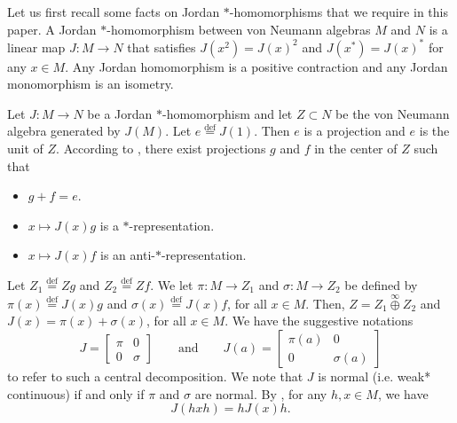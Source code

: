 \documentclass[leqno]{article} %
\newcommand{\co}{\colon}
\newcommand{\ov}{\overset}
\numberwithin{equation}{section}
\begin{document}
Let us first recall some facts on Jordan $*$-homomorphisms that we require in this paper. A Jordan $*$-homomorphism between von Neumann algebras $M$ and $N$ is a linear map $J \co M \to N$ that satisfies $J(x^2)=J(x)^2$ and $J(x^*)=J(x)^*$ for any $x \in M$. 
Any Jordan homomorphism is a positive contraction and any Jordan monomorphism is an isometry.

Let $J \co M \to N$ be a Jordan $*$-homomorphism and let $Z \subset N$ be the von Neumann algebra generated by $J(M)$. Let $e \ov{\mathrm{def}}{=} J(1)$. Then $e$ is a projection and $e$ is the unit of $Z$. According to \cite[Theorem 3.3]{Sto11}, there exist projections $g$ and $f$ in the center of $Z$ such that
\begin{itemize}
	\item [(i)] $g+f=e$.
	\item [(ii)] $x \mapsto J(x)g$ is a $*$-representation.
	\item [(iii)] $x \mapsto J(x)f$ is an anti-$*$-representation. 
\end{itemize}
Let $Z_1 \ov{\mathrm{def}}{=} Zg$ and $Z_2 \ov{\mathrm{def}}{=} Zf$.  We let $\pi \co M \to Z_1$ and $\sigma \co M \to Z_2$ be defined by $\pi(x) \ov{\mathrm{def}}{=} J(x)g$ and $\sigma(x) \ov{\mathrm{def}}{=} J(x)f$, for all $x \in M$. Then, $Z=Z_1 \mathop{\oplus}\limits^{\infty}Z_2$ and $J(x)=\pi(x)+\sigma(x)$, for all $x \in M$. We have the suggestive notations 
\begin{equation}
\label{pisigma}
J
=\begin{bmatrix}
\pi&0\\
0&\sigma
\end{bmatrix}
\qquad \text{and} \qquad
J(a)
=\begin{bmatrix}
\pi(a)&0\\
0&\sigma(a)
\end{bmatrix}
\end{equation}
to refer to such a central decomposition. We note that $J$ is normal (i.e. weak* continuous) if and only if $\pi$ and $\sigma$ are normal. By \cite[page 774]{KaR2}, for any $h,x \in M$, we have
\begin{equation}
\label{Equa-magique-1}
J(hxh)
=hJ(x)h.
\end{equation}
\end{document}
